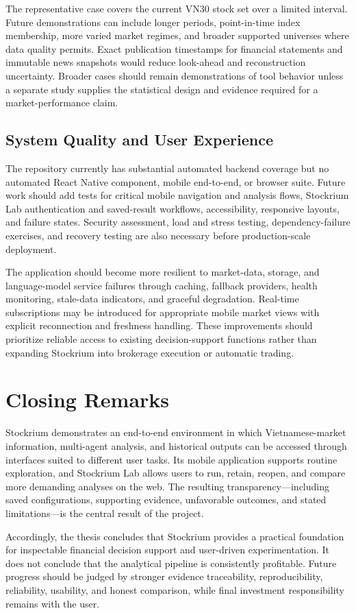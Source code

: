 The representative case covers the current VN30 stock set over a limited interval. Future demonstrations can include longer periods, point-in-time index membership, more varied market regimes, and broader supported universes where data quality permits. Exact publication timestamps for financial statements and immutable news snapshots would reduce look-ahead and reconstruction uncertainty. Broader cases should remain demonstrations of tool behavior unless a separate study supplies the statistical design and evidence required for a market-performance claim.

\subsection{System Quality and User Experience}

The repository currently has substantial automated backend coverage but no automated React Native component, mobile end-to-end, or browser suite. Future work should add tests for critical mobile navigation and analysis flows, Stockrium Lab authentication and saved-result workflows, accessibility, responsive layouts, and failure states. Security assessment, load and stress testing, dependency-failure exercises, and recovery testing are also necessary before production-scale deployment.

The application should become more resilient to market-data, storage, and language-model service failures through caching, fallback providers, health monitoring, stale-data indicators, and graceful degradation. Real-time subscriptions may be introduced for appropriate mobile market views with explicit reconnection and freshness handling. These improvements should prioritize reliable access to existing decision-support functions rather than expanding Stockrium into brokerage execution or automatic trading.

\section{Closing Remarks}
\label{sec:closing-remarks}

Stockrium demonstrates an end-to-end environment in which Vietnamese-market information, multi-agent analysis, and historical outputs can be accessed through interfaces suited to different user tasks. Its mobile application supports routine exploration, and Stockrium Lab allows users to run, retain, reopen, and compare more demanding analyses on the web. The resulting transparency---including saved configurations, supporting evidence, unfavorable outcomes, and stated limitations---is the central result of the project.

Accordingly, the thesis concludes that Stockrium provides a practical foundation for inspectable financial decision support and user-driven experimentation. It does not conclude that the analytical pipeline is consistently profitable. Future progress should be judged by stronger evidence traceability, reproducibility, reliability, usability, and honest comparison, while final investment responsibility remains with the user.
